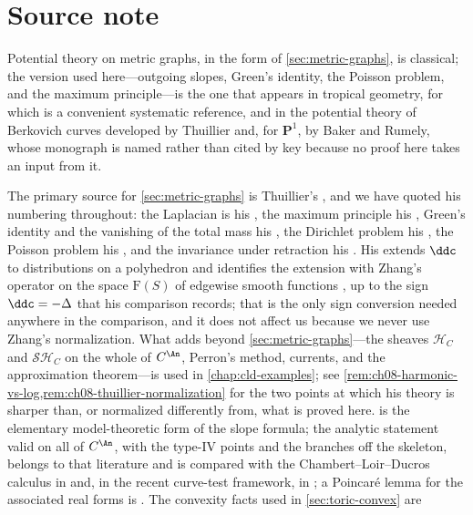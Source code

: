 \section{Source note}

Potential theory on metric graphs, in the form of
\cref{sec:metric-graphs}, is classical; the version used here---outgoing
slopes, Green's identity, the Poisson problem, and the maximum
principle---is the one that appears in tropical geometry, for which
\cite{MR18Tropical} is a convenient systematic reference, and in the
potential theory of Berkovich curves developed by Thuillier \cite{Thu05}
and, for $\mathbf P^1$, by Baker and Rumely, whose monograph is named rather
than cited by key because no proof here takes an input from it.

The primary source for \cref{sec:metric-graphs} is Thuillier's
\cite[\S1.2]{Thu05}, and we have quoted his numbering throughout: the
Laplacian is his \cite[\S1.2.1]{Thu05}, the maximum principle his
\cite[Prop.~1.2.9, Cor.~1.2.10]{Thu05}, Green's identity and the vanishing of
the total mass his \cite[Prop.~1.2.13, Cor.~1.2.14]{Thu05}, the Dirichlet
problem his \cite[Prop.~1.2.15, Rem.~1.2.16]{Thu05}, the Poisson problem his
\cite[Prop.~1.2.17, Lem.~1.2.18]{Thu05}, and the invariance under retraction
his \cite[Prop.~1.2.20]{Thu05}.  His \cite[\S1.2.5]{Thu05} extends $\ddc$ to
distributions on a polyhedron and identifies the extension with Zhang's
operator on the space $\mathrm F(S)$ of edgewise smooth functions
\cite[Prop.~1.2.21]{Thu05}, up to the sign $\ddc=-\Delta$ that his
comparison records; that is the only sign conversion needed anywhere in the
comparison, and it does not affect us because we never use Zhang's
normalization.  What \cite{Thu05} adds beyond
\cref{sec:metric-graphs}---the sheaves $\mathcal H_C$ and
$\mathcal{SH}_C$ on the whole of $C^{\An}$, Perron's method, currents, and
the approximation theorem---is used in \cref{chap:cld-examples}; see
\cref{rem:ch08-harmonic-vs-log,rem:ch08-thuillier-normalization} for the two
points at which his theory is sharper than, or normalized differently from,
what is proved here.
 is the elementary model-theoretic form of the
slope formula; the analytic statement valid on all of $C^{\An}$, with the
type-$\mathrm{IV}$ points and the branches off the skeleton, belongs to that
literature and is compared with the Chambert--Loir--Ducros calculus in
\cite{Wanner19} and, in the recent curve-test framework, in
\cite{GR25PL,GR25Classical}; a Poincar\'e lemma for the associated real forms
is \cite{Jell16}.  The convexity facts used in \cref{sec:toric-convex} are
